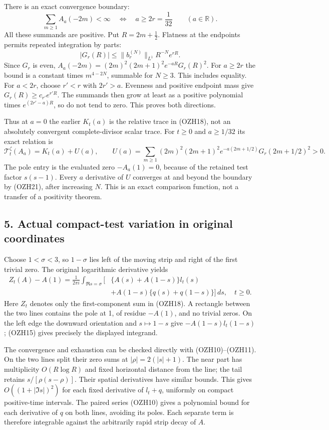 \documentclass[
  10pt,
  a4paper,
]{article}
\begin{document}
There is an exact convergence boundary: \[
\boxed{\sum_{m\ge1}A_a(-2m)<\infty
\quad\Longleftrightarrow\quad a\ge2r=\frac1{32}
\qquad(a\in\mathbb R).}
\tag{OZH20}
\] All these summands are positive. Put \(R=2m+\frac12\). Flatness at
the endpoints permits repeated integration by parts: \[
|G_r(R)|\le\|b_r^{(N)}\|_{L^1}R^{-N}e^{rR}.
\tag{OZH21}
\] Since \(G_r\) is even, \(A_a(-2m)=(2m)^2(2m+1)^2e^{-aR}G_r(R)^2\).
For \(a\ge2r\) the bound is a constant times \(m^{4-2N}\), summable for
\(N\ge3\). This includes equality. For \(a<2r\), choose \(r'<r\) with
\(2r'>a\). Evenness and positive endpoint mass give
\(G_r(R)\ge c_{r'}e^{r'R}\). The summands then grow at least as a
positive polynomial times \(e^{(2r'-a)R}\), so do not tend to zero. This
proves both directions.

Thus at \(a=0\) the earlier \(K_t(a)\) is the relative trace in (OZH18),
not an absolutely convergent complete-divisor scalar trace. For
\(t\ge0\) and \(a\ge1/32\) its exact relation is \[
\mathcal T_t^\zeta(A_a)=K_t(a)+U(a),\qquad
U(a)=\sum_{m\ge1}(2m)^2(2m+1)^2
e^{-a(2m+1/2)}G_r(2m+1/2)^2>0.
\tag{OZH22}
\] The pole entry is the evaluated zero \(-A_a(1)=0\), because of the
retained test factor \(s(s-1)\). Every \(a\) derivative of \(U\)
converges at and beyond the boundary by (OZH21), after increasing \(N\).
This is an exact comparison function, not a transfer of a positivity
theorem.

\subsection{5. Actual compact-test variation in original
coordinates}\label{actual-compact-test-variation-in-original-coordinates}

Choose \(1<\sigma<3\), so \(1-\sigma\) lies left of the moving strip and
right of the first trivial zero. The original logarithmic derivative
yields \[
\begin{aligned}
Z_t(A)-A(1)=\frac1{2\pi i}\int_{\Re s=\sigma}
\bigl[&
\{A(s)+A(1-s)\}l_t(s)\\
&+A(1-s)\{q(s)+q(1-s)\}\bigr]\,ds,\quad t\ge0 .
\end{aligned}\tag{OZH23}
\] Here \(Z_t\) denotes only the first-component sum in (OZH18). A
rectangle between the two lines contains the pole at 1, of residue
\(-A(1)\), and no trivial zeros. On the left edge the downward
orientation and \(s\mapsto1-s\) give \(-A(1-s)l_t(1-s)\); (OZH15) gives
precisely the displayed integrand.

The convergence and exhaustion can be checked directly with
(OZH10)--(OZH11). On the two lines split their zero sums at
\(|\rho|=2(|s|+1)\). The near part has multiplicity \(O(R\log R)\) and
fixed horizontal distance from the line; the tail retains
\(s/[\rho(s-\rho)]\). Their spatial derivatives have similar bounds.
This gives \(O((1+|\Im s|)^2)\) for each fixed derivative of \(l_t+q\),
uniformly on compact positive-time intervals. The paired series (OZH10)
gives a polynomial bound for each derivative of \(q\) on both lines,
avoiding its poles. Each separate term is therefore integrable against
the arbitrarily rapid strip decay of \(A\).
\end{document}
